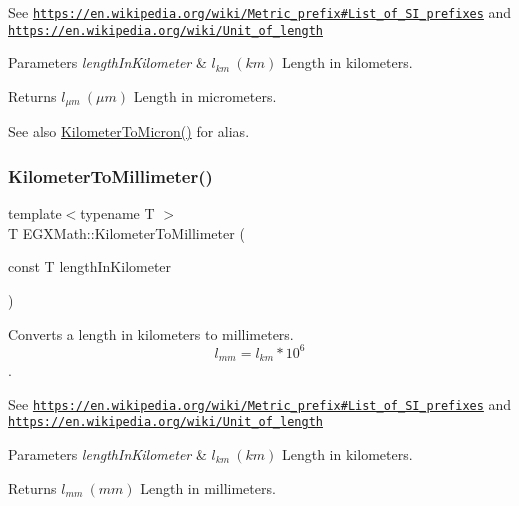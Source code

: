 See \href{https://en.wikipedia.org/wiki/Metric_prefix#List_of_SI_prefixes}{\tt https\+://en.\+wikipedia.\+org/wiki/\+Metric\+\_\+prefix\#\+List\+\_\+of\+\_\+\+S\+I\+\_\+prefixes} and \href{https://en.wikipedia.org/wiki/Unit_of_length}{\tt https\+://en.\+wikipedia.\+org/wiki/\+Unit\+\_\+of\+\_\+length} 
\begin{DoxyParams}{Parameters}
{\em length\+In\+Kilometer} & $ l_{km}\ (km)$ Length in kilometers. \\
\hline
\end{DoxyParams}
\begin{DoxyReturn}{Returns}
$ l_{\mu m}\ (\mu m)$ Length in micrometers. 
\end{DoxyReturn}
\begin{DoxySeeAlso}{See also}
\mbox{\hyperlink{group___e_g_x_math-_conversions-_length_conversions-_kilometer-_non-_s_i_gae662bafe0d1fc36276a336fd969307a0}{Kilometer\+To\+Micron()}} for alias. 
\end{DoxySeeAlso}
\mbox{\label{group___e_g_x_math-_conversions-_length_conversions-_kilometer-_s_i_ga109bb9ca348173d3bfd643a4e3bd3686}} 
\subsubsection{\texorpdfstring{Kilometer\+To\+Millimeter()}{KilometerToMillimeter()}}
{\footnotesize\ttfamily template$<$typename T $>$ \\
T E\+G\+X\+Math\+::\+Kilometer\+To\+Millimeter (\begin{DoxyParamCaption}\item[{const T}]{length\+In\+Kilometer }\end{DoxyParamCaption})}



Converts a length in kilometers to millimeters. \[ l_{mm}=l_{km} * 10^{6} \]. 

See \href{https://en.wikipedia.org/wiki/Metric_prefix#List_of_SI_prefixes}{\tt https\+://en.\+wikipedia.\+org/wiki/\+Metric\+\_\+prefix\#\+List\+\_\+of\+\_\+\+S\+I\+\_\+prefixes} and \href{https://en.wikipedia.org/wiki/Unit_of_length}{\tt https\+://en.\+wikipedia.\+org/wiki/\+Unit\+\_\+of\+\_\+length} 
\begin{DoxyParams}{Parameters}
{\em length\+In\+Kilometer} & $ l_{km}\ (km)$ Length in kilometers. \\
\hline
\end{DoxyParams}
\begin{DoxyReturn}{Returns}
$ l_{mm}\ (mm)$ Length in millimeters. 
\end{DoxyReturn}
\mbox{\label{group___e_g_x_math-_conversions-_length_conversions-_kilometer-_s_i_gaa2272319841906222fd95dc1c3e90549}} 
